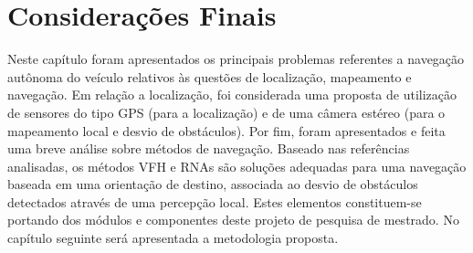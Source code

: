 \section{Considerações Finais}
	
Neste capítulo foram apresentados os principais problemas referentes a navegação
autônoma do veículo relativos às questões de localização, mapeamento e
navegação. Em relação a localização, foi considerada uma proposta de utilização
de sensores do tipo GPS (para a localização) e de uma câmera estéreo (para o
mapeamento local e desvio de obstáculos). Por fim, foram apresentados e feita
uma breve análise sobre métodos de navegação. Baseado nas referências
analisadas, os métodos VFH e RNAs são soluções adequadas para uma navegação
baseada em uma orientação de destino, associada ao desvio de obstáculos
detectados através de uma percepção local. Estes elementos constituem-se
portando dos módulos e componentes deste projeto de pesquisa de mestrado. No
capítulo seguinte será apresentada a metodologia proposta.

